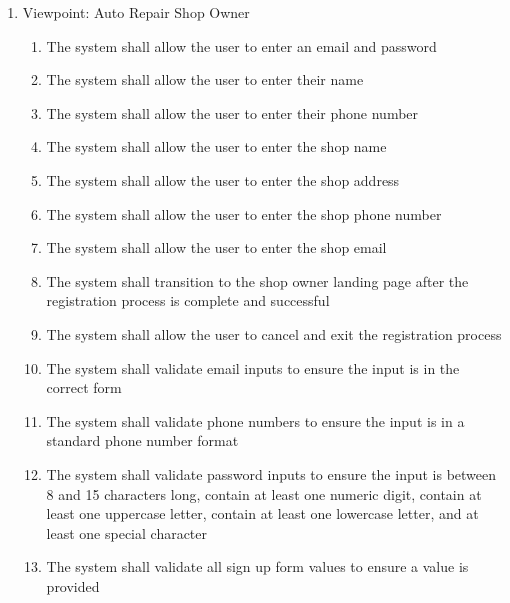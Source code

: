 \documentclass[12pt]{article}
\begin{document}
\begin{enumerate}[label=BE\arabic*., series=business_events]
\begin{enumerate}[VP\arabic*.]
		      \item Viewpoint: Auto Repair Shop Owner
		            \begin{enumerate}
			            \item The system shall allow the user to enter an email and password
			            \item The system shall allow the user to enter their name
			            \item The system shall allow the user to enter their phone number
			            \item The system shall allow the user to enter the shop name
			            \item The system shall allow the user to enter the shop address
			            \item The system shall allow the user to enter the shop phone number
			            \item The system shall allow the user to enter the shop email
			            \item The system shall transition to the shop owner landing page after the registration process is
			                  complete and successful
			            \item The system shall allow the user to cancel and exit the registration process
			            \item The system shall validate email inputs to ensure the input is in the correct form
			            \item The system shall validate phone numbers to ensure the input is in a standard phone number format
			            \item The system shall validate password inputs to ensure the input is between 8 and 15 characters long,
			                  contain at least one numeric digit, contain at least one uppercase letter, contain at least one
			                  lowercase letter, and at least one special character
			            \item The system shall validate all sign up form values to ensure a value is provided
		            \end{enumerate}


\end{enumerate}
\end{enumerate}
\end{document}
